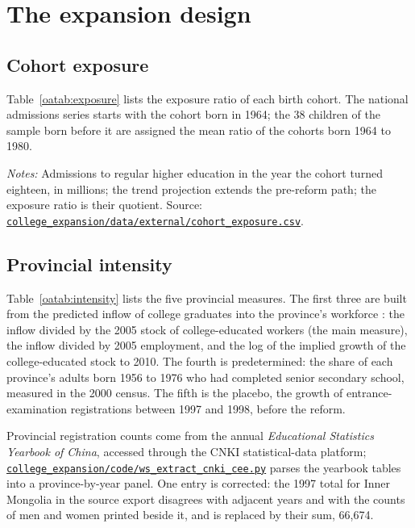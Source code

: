 \documentclass[11pt]{article}
\numberwithin{equation}{section}
\newcommand{\repourl}{https://github.com/JiachenJin1001/before-the-labor-market-or-inside-it}
\newcommand{\code}[1]{\href{\repourl/blob/main/#1}{\nolinkurl{#1}}}
\begin{document}
\section{The expansion design}
\label{oa:expansion}

\subsection{Cohort exposure}

Table~\ref{oatab:exposure} lists the exposure ratio of each birth cohort. The national admissions series starts with the cohort born in 1964; the 38 children of the sample born before it are assigned the mean ratio of the cohorts born 1964 to 1980.

\begin{table}[H]
\centering
\footnotesize
\caption{National admissions and the exposure ratio by birth year.}
\label{oatab:exposure}
\setlength{\tabcolsep}{4pt}

\par\smallskip
\begin{minipage}{0.96\textwidth}
\footnotesize\emph{Notes:} Admissions to regular higher education in
the year the cohort turned eighteen, in millions; the trend projection
extends the pre-reform path; the exposure ratio is their quotient.
Source: \code{college_expansion/data/external/cohort_exposure.csv}.
\end{minipage}
\end{table}

\subsection{Provincial intensity}

Table~\ref{oatab:intensity} lists the five provincial measures. The
first three are built from the predicted inflow
of college graduates into the province's workforce \citep{Ma2024IER}:
the inflow divided by the 2005 stock of college-educated workers (the
main measure), the inflow divided by 2005 employment, and the log of
the implied growth of the college-educated stock to 2010. The fourth is predetermined:
the share of each province's adults born 1956 to 1976 who had completed
senior secondary school, measured in the 2000 census. The fifth is the
placebo, the growth of entrance-examination registrations between 1997
and 1998, before the reform.

Provincial registration counts come from the annual \emph{Educational Statistics Yearbook of China}, accessed through the CNKI
statistical-data platform; \code{college_expansion/code/ws_extract_cnki_cee.py}
parses the yearbook tables into a province-by-year panel. One entry is corrected: the 1997 total for Inner Mongolia in the source export
disagrees with adjacent years and with the counts of men and women
printed beside it, and is replaced by their sum, 66,674.
\end{document}

